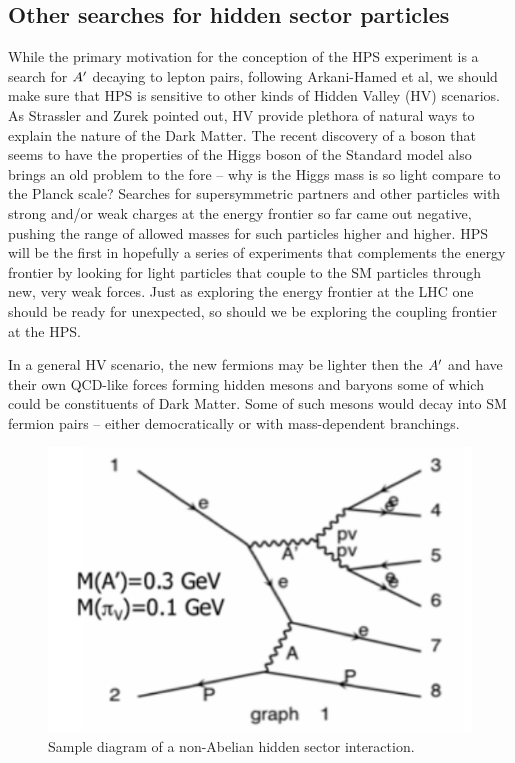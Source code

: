 \subsection{Other searches for hidden sector particles}


While the primary motivation for the conception of the HPS experiment is a search for $A^\prime$ decaying to lepton pairs, following Arkani-Hamed et al, we should make sure that HPS is sensitive to other kinds of Hidden Valley (HV) scenarios. As Strassler and Zurek pointed out, HV provide plethora of natural ways to explain the nature of the Dark Matter. The recent discovery of a boson that seems to have the properties of the Higgs boson of the Standard model also brings an old problem to the fore – why is the Higgs mass is so light compare to the Planck scale? Searches for supersymmetric partners and other particles with strong and/or weak charges at the energy frontier so far came out negative, pushing the range of allowed masses for such particles higher and higher. HPS will be the first in hopefully a series of experiments that complements the energy frontier by looking for light particles that couple to the SM particles through new, very weak forces. Just as exploring the energy frontier at the LHC one should be ready for unexpected, so should we be exploring the coupling frontier at the HPS.

In a general HV scenario, the new fermions may be lighter then the $A^\prime$ and have their own QCD-like forces forming hidden mesons and baryons some of which could be constituents of Dark Matter. Some of such mesons would decay into SM fermion pairs – either democratically or with mass-dependent branchings.


\begin{figure}
\includegraphics[scale=1]{measurements/multilepton-diagram.pdf}
\caption{Sample diagram of a non-Abelian hidden sector interaction.}
\label{fig:mldiagram}
\end{figure}

